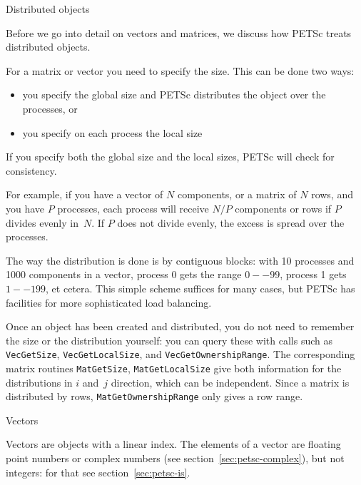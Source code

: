 
 {Distributed objects}

Before we go into detail on vectors and matrices, we discuss how PETSc
treats distributed objects.

For a matrix or vector you need to specify the size. This can be done two ways:
\begin{itemize}
\item you specify the global size and PETSc distributes the object over the processes, or
\item you specify on each process the local size
\end{itemize}
If you specify both the global size and the local sizes, PETSc will check for consistency.

For example, if you have a vector of $N$ components, or a matrix of $N$
rows, and you have $P$ processes, each process will receive $N/P$
components or rows if $P$ divides evenly in~$N$. If $P$ does not divide
evenly, the excess is spread over the processes.

The way the distribution is done is by contiguous blocks: with 10
processes and 1000 components in a vector, process 0 gets the range
$0--99$, process 1 gets $1--199$, et cetera. This simple scheme suffices for
many cases, but PETSc has facilities for more sophisticated load
balancing.

Once an object has been created and distributed, you do not need to
remember the size or the distribution yourself: you can query these
with calls such as \lstinline{VecGetSize},
\lstinline{VecGetLocalSize}, and \lstinline{VecGetOwnershipRange}. The
corresponding matrix routines \lstinline{MatGetSize},
\lstinline{MatGetLocalSize} give both information for the
distributions in $i$ and~$j$ direction, which can be
independent. Since a matrix is distributed by rows,
\lstinline{MatGetOwnershipRange} only gives a row range.

 {Vectors}

Vectors are objects with a linear index. The elements of a vector are
floating point numbers or complex numbers (see
section~\ref{sec:petsc-complex}), but not integers: for that see
section~\ref{sec:petsc-is}.

